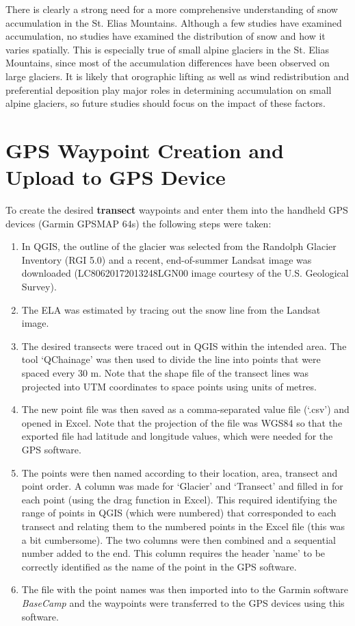 \documentclass{sfuthesis}
\begin{document}
\begin{appendices}
There is clearly a strong need for a more comprehensive understanding of snow accumulation in the St. Elias Mountains. Although a few studies have examined accumulation, no studies have examined the distribution of snow and how it varies spatially. This is especially true of small alpine glaciers in the St. Elias Mountains, since most of the accumulation differences have been observed on large glaciers. It is likely that orographic lifting as well as wind redistribution and preferential deposition play major roles in determining accumulation on small alpine glaciers, so future studies should focus on the impact of these factors. 


	\chapter{GPS Waypoint Creation and Upload to GPS Device}
	\label{app:GPSwaypoints}
	
	To create the desired \textbf{transect} waypoints and enter them into the handheld GPS devices (Garmin GPSMAP 64s) the following steps were taken:
\begin{enumerate}
\item In QGIS, the outline of the glacier was selected from the Randolph Glacier Inventory (RGI 5.0) \citep{Pfeffer2014} and a recent, end-of-summer Landsat image was downloaded (LC80620172013248LGN00 image courtesy of the U.S. Geological Survey). 
\item The ELA was estimated by tracing out the snow line from the Landsat image.
\item The desired transects were traced out in QGIS within the intended area. The tool `QChainage' was then used to divide the line into points that were spaced every 30 m. Note that the shape file of the transect lines was projected into UTM coordinates to space points using units of metres. 
\item The new point file was then saved as a comma-separated value file (`.csv') and opened in Excel. Note that the projection of the file was WGS84 so that the exported file had latitude and longitude values, which were needed for the GPS software.
\item The points were then named according to their location, area, transect and point order. A column was made for `Glacier' and `Transect' and filled in for each point (using the drag function in Excel). This required identifying the range of points in QGIS (which were numbered) that corresponded to each transect and relating them to the numbered points in the Excel file (this was a bit cumbersome). The two columns were then combined and a sequential number added to the end. This column requires the header 'name' to be correctly identified as the name of the point in the GPS software.
\item The file with the point names was then imported into to the Garmin software \textit{BaseCamp} and the waypoints were transferred to the GPS devices using this software. 
\end{enumerate}


\end{appendices}
\end{document}
